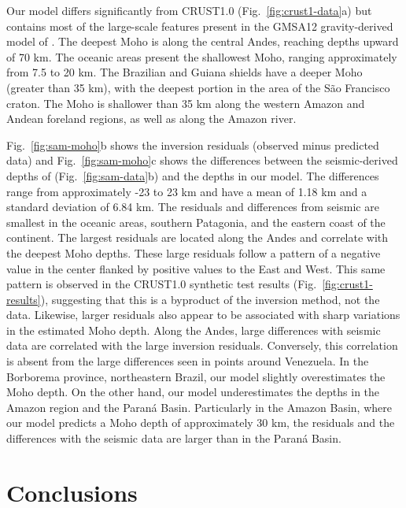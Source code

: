 \documentclass[extra,mreferee]{gji}
\begin{document}
Our model differs significantly from CRUST1.0 (Fig.~\ref{fig:crust1-data}a)
but contains most of the large-scale features
present in the GMSA12 gravity-derived model of \citet{vandermeijde2013}.
The deepest Moho is along the central Andes, reaching depths upward of 70 km.
The oceanic areas present the shallowest Moho, ranging approximately
from 7.5 to 20 km.
The Brazilian and Guiana shields have a deeper Moho (greater than 35 km),
with the deepest portion in the area of the São Francisco craton.
The Moho is shallower than 35 km along the western Amazon and Andean foreland
regions, as well as along the Amazon river.

Fig.~\ref{fig:sam-moho}b shows the inversion residuals
(observed minus predicted data)
and Fig.~\ref{fig:sam-moho}c shows the differences between
the seismic-derived depths of \citet{assumpcao2013a}
(Fig.~\ref{fig:sam-data}b) and the depths in our model.
The differences range from approximately -23 to 23 km
and have a mean of 1.18 km and a standard deviation of 6.84 km.
The residuals and differences from seismic are smallest in the oceanic areas,
southern Patagonia, and the eastern coast of the continent.
The largest residuals are located along the Andes and correlate with the
deepest Moho depths.
These large residuals follow a pattern of a negative value in the center
flanked by positive values to the East and West.
This same pattern is observed in the CRUST1.0 synthetic test results
(Fig.~\ref{fig:crust1-results}),
suggesting that this is a byproduct of the inversion method, not the data.
Likewise, larger residuals also appear to be associated with sharp variations
in the estimated Moho depth.
Along the Andes, large differences with seismic data are correlated with the
large inversion residuals.
Conversely, this correlation is absent from the large differences seen in
points around Venezuela.
In the Borborema province, northeastern Brazil,
our model slightly overestimates the Moho depth.
On the other hand, our model underestimates the depths
in the Amazon region and the Paraná Basin.
Particularly in the Amazon Basin,
where our model predicts a Moho depth of approximately 30 km,
the residuals and the differences with the seismic data are larger than in the
Paraná Basin.



\section{Conclusions}
\end{document}
